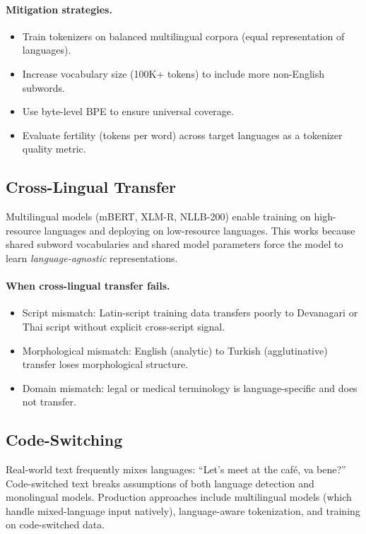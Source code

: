 \paragraph{Mitigation strategies.}
\begin{itemize}
    \item Train tokenizers on balanced multilingual corpora (equal representation of
          languages).
    \item Increase vocabulary size (100K+ tokens) to include more non-English subwords.
    \item Use byte-level BPE to ensure universal coverage.
    \item Evaluate fertility (tokens per word) across target languages as a tokenizer
          quality metric.
\end{itemize}

\subsection{Cross-Lingual Transfer}

Multilingual models (mBERT, XLM-R, NLLB-200) enable training on high-resource languages
and deploying on low-resource languages.  This works because shared subword vocabularies
and shared model parameters force the model to learn \emph{language-agnostic}
representations.

\paragraph{When cross-lingual transfer fails.}
\begin{itemize}
    \item Script mismatch: Latin-script training data transfers poorly to Devanagari or
          Thai script without explicit cross-script signal.
    \item Morphological mismatch: English (analytic) to Turkish (agglutinative)
          transfer loses morphological structure.
    \item Domain mismatch: legal or medical terminology is language-specific and does
          not transfer.
\end{itemize}

\subsection{Code-Switching}

Real-world text frequently mixes languages: ``Let's meet at the caf\'{e}, va bene?''
Code-switched text breaks assumptions of both language detection and monolingual models.
Production approaches include multilingual models (which handle mixed-language input
natively), language-aware tokenization, and training on code-switched data.


